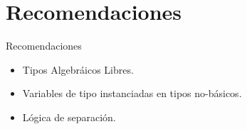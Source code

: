 \section{Recomendaciones}
\begin{frame}{Recomendaciones}
\begin{itemize}
  \item Tipos Algebráicos Libres.
  \item Variables de tipo instanciadas en tipos no-básicos.
  \item Lógica de separación.
\end{itemize}
\end{frame}